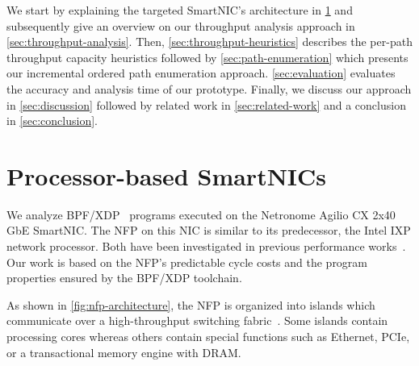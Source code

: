 \documentclass[sigconf,screen,authordraft]{acmart}
\newcommand{\afblock}[1]{\noindent{\textbf{#1.}}}
\newcommand{\islandcolor}[1]{\textcolor{RWTHblau}{#1}}
\newcommand{\corecolor}[1]{\textcolor{RWTHgrun}{#1}}
\newcommand{\dramcolor}[1]{\textcolor{RWTHturkis}{#1}}
\newcommand{\fabriccolor}[1]{\textcolor{RWTHmagenta}{#1}}
\begin{document}
\afblock{Structure}
We start by explaining the targeted SmartNIC's architecture in \ref{sec:background} and subsequently give an overview on our throughput analysis approach in \ref{sec:throughput-analysis}.
Then, \ref{sec:throughput-heuristics} describes the per-path throughput capacity heuristics followed by \ref{sec:path-enumeration} which presents our incremental ordered path enumeration approach.
\ref{sec:evaluation} evaluates the accuracy and analysis time of our prototype.
Finally, we discuss our approach in \ref{sec:discussion} followed by related work in \ref{sec:related-work} and a conclusion in \ref{sec:conclusion}.


\section{Processor-based SmartNICs}
\label{sec:background}

We analyze BPF/XDP~\cite{XDP-offload,XDP} programs executed on the Netronome Agilio CX 2x40 GbE SmartNIC.
The \ac{NFP} on this NIC is similar to its predecessor, the Intel IXP network processor.
Both have been investigated in previous performance works~\cite{shangri-la,nova,ixp-partitioning,xdp-performance,p4-performance,clara,pcie-performance}.
Our work is based on the \ac{NFP}'s predictable cycle costs and the program properties ensured by the BPF/XDP toolchain.

\afblock{Islands}
As shown in \ref{fig:nfp-architecture}, the \ac{NFP} is organized into \islandcolor{islands} which communicate over a high-throughput \fabriccolor{switching fabric}~\cite{XDP-offload,composable-silicon,joy-of-micro-c}.
Some \islandcolor{islands} contain \corecolor{processing cores} whereas others contain special functions such as Ethernet, PCIe, or a transactional memory engine with \dramcolor{DRAM}.
\end{document}
